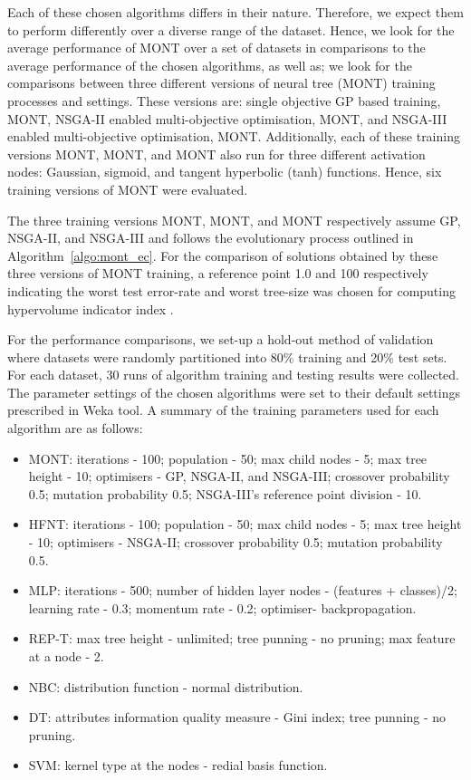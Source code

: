 \documentclass[conference]{IEEEtran}
\begin{document}
Each of these chosen algorithms differs in their nature. Therefore, we expect them to perform differently over a diverse range of the dataset. Hence, we look for the average performance of MONT over a set of datasets in comparisons to the average performance of the chosen algorithms, as well as; we look for the comparisons between three different versions of neural tree (MONT) training processes and settings. These versions are: single objective GP based training, MONT, NSGA-II enabled multi-objective optimisation, MONT, and NSGA-III enabled multi-objective optimisation, MONT. Additionally, each of these training versions MONT, MONT, and MONT also run for three different activation nodes: Gaussian, sigmoid, and tangent hyperbolic (tanh) functions. Hence, six training versions of MONT were evaluated.  

The three training versions MONT, MONT, and MONT respectively assume GP, NSGA-II, and NSGA-III and follows the evolutionary process outlined in Algorithm~\ref{algo:mont_ec}. For the comparison of solutions obtained by these three versions of MONT training, a reference point 1.0 and 100 respectively indicating the worst test error-rate and worst tree-size was chosen for computing hypervolume indicator index .     

For the performance comparisons, we set-up a hold-out method of validation where datasets were randomly partitioned into 80\% training and 20\% test sets. For each dataset, 30 runs of algorithm training and testing results were collected. The parameter settings of the chosen algorithms were set to their default settings prescribed in Weka tool. A summary of the training parameters used for each algorithm are as follows:
\begin{itemize}
    \item MONT: iterations - 100; population - 50; max child nodes - 5; max tree height - 10; optimisers - GP, NSGA-II, and NSGA-III; crossover probability 0.5; mutation probability 0.5; NSGA-III's reference point division - 10.
    \item HFNT: iterations - 100; population - 50; max child nodes - 5; max tree height - 10; optimisers - NSGA-II; crossover probability 0.5; mutation probability 0.5.
    \item MLP: iterations - 500; number of hidden layer nodes - (features + classes)/2; learning rate - 0.3; momentum rate - 0.2; optimiser-  backpropagation.
    \item REP-T:  max tree height - unlimited; tree punning - no pruning; max feature at a node - 2.
    \item NBC: distribution function - normal distribution.
    \item DT: attributes information quality measure -  Gini index; tree punning - no pruning.
    \item SVM: kernel type at the nodes - redial basis function.
\end{itemize}
\end{document}
